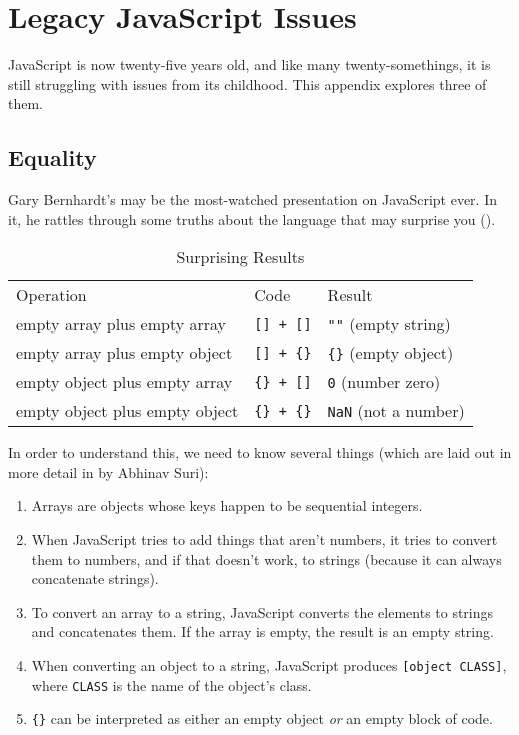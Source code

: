 \chapter{Legacy JavaScript Issues}\label{s:legacy}

JavaScript is now twenty-five years old,
and like many twenty-somethings,
it is still struggling with issues from its childhood.
This appendix explores three of them.

\section{Equality}\label{s:legacy-equality}

Gary Bernhardt's 
may be the most-watched presentation on JavaScript ever.
In it,
he rattles through some truths about the language that may surprise you
().

\begin{table}
\begin{longtable}{lll}
Operation & Code & Result \\
empty array plus empty array & \texttt{[]\ +\ []} & \texttt{""} (empty string) \\
empty array plus empty object & \texttt{[]\ +\ \{\}} & \texttt{\{\}} (empty object) \\
empty object plus empty array & \texttt{\{\}\ +\ []} & \texttt{0} (number zero) \\
empty object plus empty object & \texttt{\{\}\ +\ \{\}} & \texttt{NaN} (not a number) \\
\end{longtable}
\caption{Surprising Results}
\label{t:legacy-surprises}
\end{table}

In order to understand this, we need to know several things
(which are laid out in more detail in  by Abhinav Suri):

\begin{enumerate}
\item
  Arrays are objects whose keys happen to be sequential integers.
\item
  When JavaScript tries to add things that aren't numbers,
  it tries to convert them to numbers,
  and if that doesn't work,
  to strings (because it can always concatenate strings).
\item
  To convert an array to a string,
  JavaScript converts the elements to strings and concatenates them.
  If the array is empty, the result is an empty string.
\item
  When converting an object to a string,
  JavaScript produces \texttt{[object\ CLASS]},
  where \texttt{CLASS} is the name of the object's class.
\item
  \texttt{\{\}} can be interpreted as either an empty object \emph{or} an empty block of code.
\end{enumerate}

